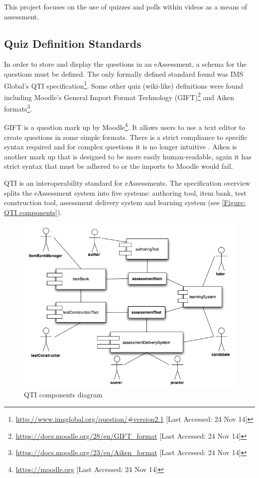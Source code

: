 This project focuses on the use of quizzes and polls within videos as a means of assessment.

\subsection{Quiz Definition Standards}
\label{Subsection:Quiz Definition Standards}
In order to store and display the questions in an \gls{eAssessment}, a schema for the questions must be defined. The only formally defined standard found was IMS Global's \gls{QTI} specification\footnote{\url{http://www.imsglobal.org/question/\#version2.1} [Last Accessed: 24 Nov 14]}. Some other quiz (wiki-like) definitions were found including Moodle's General Import Format Technology (GIFT)\footnote{\url{https://docs.moodle.org/28/en/GIFT_format} [Last Accessed: 24 Nov 14]} and Aiken formats\footnote{\url{https://docs.moodle.org/23/en/Aiken_format} [Last Accessed: 24 Nov 14]}.

GIFT is a question mark up by Moodle\footnote{\url{https://moodle.org} [Last Accessed: 24 Nov 14]}. It allows users to use a text editor to create questions in some simple formats. There is a strict compliance to specific syntax required and for complex questions it is no longer intuitive \citep{failQTI}. Aiken is another mark up that is designed to be more easily human-readable, again it has strict syntax that must be adhered to or the imports to Moodle would fail.

\gls{QTI} is an interoperability standard for \glspl{eAssessment}. The specification overview \citep{qtiOverview} splits the \gls{eAssessment} system into five systems: authoring tool, item bank, test construction tool, assessment delivery system and learning system (see \autoref{Figure: QTI components}).

\begin{figure}[h]
	\centering 
		\includegraphics[scale=0.3]{../figures/componentsQTI.png} 		
	\caption{\label{Figure: QTI components} QTI components diagram \citep{qtiOverview}} 	
\end{figure}

